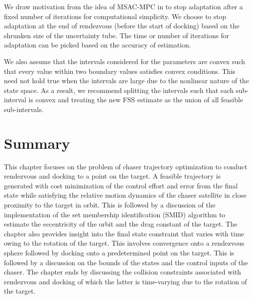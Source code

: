 We draw motivation from the idea of MSAC-MPC in \cite{tang2023indirect} to stop adaptation after a fixed number of iterations for computational simplicity.
We choose to stop adaptation at the end of rendezvous (before the start of docking) based on the shrunken size of the uncertainty tube.
The time or number of iterations for adaptation can be picked based on the accuracy of estimation.

We also assume that the intervals considered for the parameters are convex such that every value within two boundary values satisfies convex conditions.
This need not hold true when the intervals are large due to the nonlinear nature of the state space.
As a result, we recommend splitting the intervals such that each sub-interval is convex and treating the new FSS estimate as the union of all feasible sub-intervals.

\section{Summary}
This chapter focuses on the problem of chaser trajectory optimization to conduct rendezvous and docking to a point on the target.
A feasible trajectory is generated with cost minimization of the control effort and error from the final state while satisfying the relative motion dynamics of the chaser satellite in close proximity to the target in orbit.
This is followed by a discussion of the implementation of the set membership identification (SMID) algorithm to estimate the eccentricity of the orbit and the drag constant of the target.
The chapter also provides insight into the final state constraint that varies with time owing to the rotation of the target.
This involves convergence onto a rendezvous sphere followed by docking onto a predetermined point on the target.
This is followed by a discussion on the bounds of the states and the control inputs of the chaser.
The chapter ends by discussing the collision constraints associated with rendezvous and docking of which the latter is time-varying due to the rotation of the target.